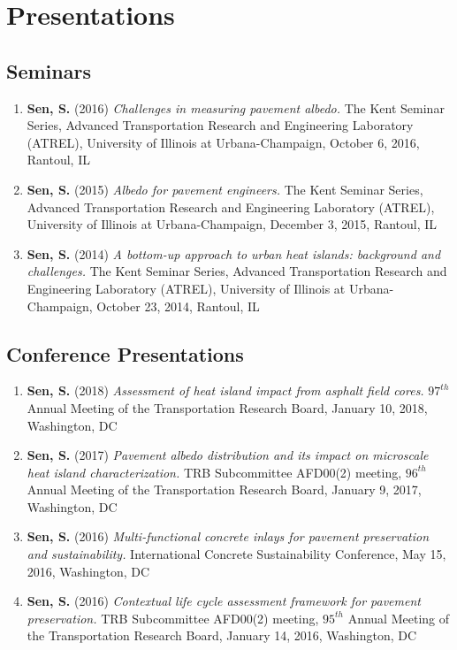 \documentclass[12pt]{article}
\begin{document}
\section*{Presentations}
\subsection*{Seminars}
\begin{enumerate}[label=(\arabic*)]
	\item \textbf{Sen, S.} (2016) \textit{Challenges in measuring pavement albedo.} The Kent Seminar Series, Advanced Transportation Research and Engineering Laboratory (ATREL), University of Illinois at Urbana-Champaign, October 6, 2016, Rantoul, IL
	\item \textbf{Sen, S.} (2015) \textit{Albedo for pavement engineers.} The Kent Seminar Series, Advanced Transportation Research and Engineering Laboratory (ATREL), University of Illinois at Urbana-Champaign, December 3, 2015, Rantoul, IL
	\item \textbf{Sen, S.} (2014) \textit{A bottom-up approach to urban heat islands: background and challenges.} The Kent Seminar Series, Advanced Transportation Research and Engineering Laboratory (ATREL), University of Illinois at Urbana-Champaign, October 23, 2014, Rantoul, IL
\end{enumerate}

\subsection*{Conference Presentations}
\begin{enumerate}[label=(\arabic*)]
	\item \textbf{Sen, S.} (2018) \textit{Assessment of heat island impact from asphalt field cores.} $97^{th}$ Annual Meeting of the Transportation Research Board, January 10, 2018, Washington, DC
	\item \textbf{Sen, S.} (2017) \textit{Pavement albedo distribution and its impact on microscale heat island characterization.} TRB Subcommittee AFD00(2) meeting, $96^{th}$ Annual Meeting of the Transportation Research Board, January 9, 2017, Washington, DC
	\item \textbf{Sen, S.} (2016) \textit{Multi-functional concrete inlays for pavement preservation and sustainability.} International Concrete Sustainability Conference, May 15, 2016, Washington, DC
	\item \textbf{Sen, S.} (2016) \textit{Contextual life cycle assessment framework for pavement preservation.} TRB Subcommittee AFD00(2) meeting, $95^{th}$ Annual Meeting of the Transportation Research Board, January 14, 2016, Washington, DC
\end{enumerate}
\end{document}
